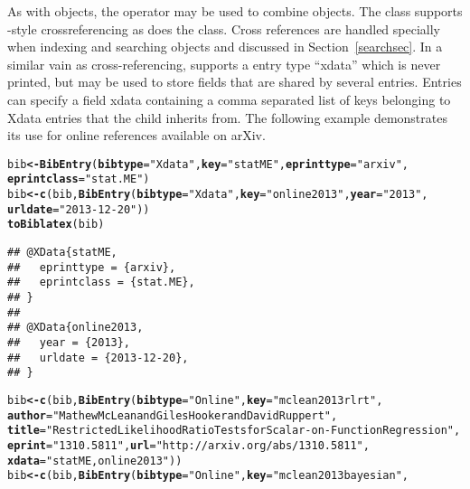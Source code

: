 \documentclass[article]{jss}\usepackage[]{graphicx}\usepackage[]{color}
\makeatletter
\newcommand{\hlstr}[1]{\textcolor[rgb]{0.125,0.125,1}{#1}}%
\newcommand{\hlstd}[1]{\textcolor[rgb]{0.251,0.251,0.282}{#1}}%
\newcommand{\hlkwb}[1]{\textcolor[rgb]{0.439,0.251,1}{\textbf{#1}}}%
\newcommand{\hlkwc}[1]{\textcolor[rgb]{0.529,0,0.184}{\textbf{#1}}}%
\newcommand{\hlkwd}[1]{\textcolor[rgb]{0.251,0.251,0.282}{\textbf{#1}}}%
\newenvironment{kframe}{%
 \def\at@end@of@kframe{}%
 \ifinner\ifhmode%
  \def\at@end@of@kframe{\end{minipage}}%
  \begin{minipage}{\columnwidth}%
 \fi\fi%
 \def\FrameCommand##1{\hskip\@totalleftmargin \hskip-\fboxsep
 \colorbox{shadecolor}{##1}\hskip-\fboxsep
     \hskip-\linewidth \hskip-\@totalleftmargin \hskip\columnwidth}%
 \MakeFramed {\advance\hsize-\width
   \@totalleftmargin\z@ \linewidth\hsize
   \@setminipage}}%
 {\par\unskip\endMakeFramed%
 \at@end@of@kframe}
\newenvironment{knitrout}{}{} %
\makeatother
\begin{document}
As with  objects, the operator  may be used to combine  objects.  The  class supports \Bibtex{}-style crossreferencing as does the  class.  Cross references are handled specially when indexing and searching  objects and discussed in Section~\ref{searchsec}.  In a similar vain as cross-referencing, \Biblatex{} supports a entry type ``xdata'' which is never printed, but may be used to store fields that are shared by several entries.  Entries can specify a field xdata containing a comma separated list of keys belonging to Xdata entries that the child inherits from.  The following example demonstrates its use for online references available on arXiv.
\begin{knitrout}
\color{fgcolor}\begin{kframe}
\begin{alltt}
\hlstd{bib} \hlkwb{<-} \hlkwd{BibEntry}\hlstd{(}\hlkwc{bibtype}\hlstd{=}\hlstr{"Xdata"}\hlstd{,} \hlkwc{key} \hlstd{=} \hlstr{"statME"}\hlstd{,} \hlkwc{eprinttype} \hlstd{=} \hlstr{"arxiv"}\hlstd{,}
                \hlkwc{eprintclass} \hlstd{=} \hlstr{"stat.ME"}\hlstd{)}
\hlstd{bib} \hlkwb{<-} \hlkwd{c}\hlstd{(bib,} \hlkwd{BibEntry}\hlstd{(}\hlkwc{bibtype}\hlstd{=}\hlstr{"Xdata"}\hlstd{,} \hlkwc{key} \hlstd{=} \hlstr{"online2013"}\hlstd{,} \hlkwc{year} \hlstd{=} \hlstr{"2013"}\hlstd{,}
                       \hlkwc{urldate} \hlstd{=} \hlstr{"2013-12-20"}\hlstd{))}
\hlkwd{toBiblatex}\hlstd{(bib)}
\end{alltt}
\begin{verbatim}
## @XData{statME,
##   eprinttype = {arxiv},
##   eprintclass = {stat.ME},
## }
## 
## @XData{online2013,
##   year = {2013},
##   urldate = {2013-12-20},
## }
\end{verbatim}
\begin{alltt}
\hlstd{bib} \hlkwb{<-} \hlkwd{c}\hlstd{(bib,} \hlkwd{BibEntry}\hlstd{(}\hlkwc{bibtype}\hlstd{=}\hlstr{"Online"}\hlstd{,} \hlkwc{key}\hlstd{=}\hlstr{"mclean2013rlrt"}\hlstd{,}
  \hlkwc{author} \hlstd{=} \hlstr{"Mathew McLean and Giles Hooker and David Ruppert"}\hlstd{,}
  \hlkwc{title} \hlstd{=} \hlstr{"Restricted Likelihood Ratio Tests for Scalar-on-Function Regression"}\hlstd{,}
  \hlkwc{eprint} \hlstd{=} \hlstr{"1310.5811"}\hlstd{,} \hlkwc{url} \hlstd{=} \hlstr{"http://arxiv.org/abs/1310.5811"}\hlstd{,}
  \hlkwc{xdata} \hlstd{=} \hlstr{"statME,online2013"}\hlstd{))}
\hlstd{bib} \hlkwb{<-} \hlkwd{c}\hlstd{(bib,} \hlkwd{BibEntry}\hlstd{(}\hlkwc{bibtype}\hlstd{=}\hlstr{"Online"}\hlstd{,} \hlkwc{key}\hlstd{=}\hlstr{"mclean2013bayesian"}\hlstd{,}

\end{alltt}
\end{kframe}
\end{knitrout}
\end{document}
